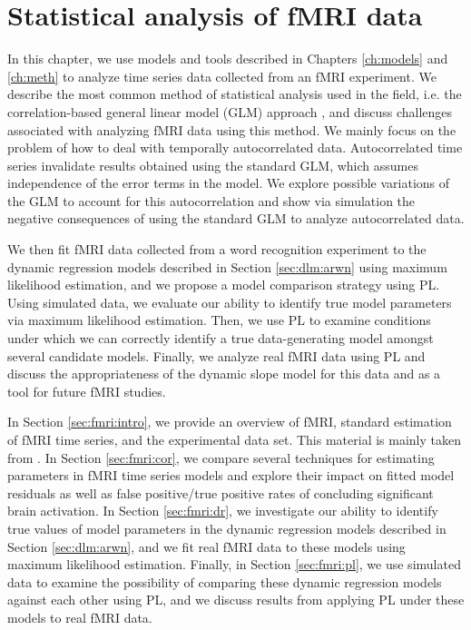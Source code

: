 \chapter{Statistical analysis of fMRI data \label{ch:fmri}}

In this chapter, we use models and tools described in Chapters \ref{ch:models} and \ref{ch:meth} to analyze time series data collected from an fMRI experiment. We describe the most common method of statistical analysis used in the field, i.e. the correlation-based general linear model (GLM) approach \citep{friston:frith:JCBFM:1991,friston:holmes:hbm:1995}, and discuss challenges associated with analyzing fMRI data using this method. We mainly focus on the problem of how to deal with temporally autocorrelated data. Autocorrelated time series invalidate results obtained using the standard GLM, which assumes independence of the error terms in the model. We explore possible variations of the GLM to account for this autocorrelation and show via simulation the negative consequences of using the standard GLM to analyze autocorrelated data.

We then fit fMRI data collected from a word recognition experiment to the dynamic regression models described in Section \ref{sec:dlm:arwn} using maximum likelihood estimation, and we propose a model comparison strategy using PL. Using simulated data, we evaluate our ability to identify true model parameters via maximum likelihood estimation. Then, we use PL to examine conditions under which we can correctly identify a true data-generating model amongst several candidate models. Finally, we analyze real fMRI data using PL and discuss the appropriateness of the dynamic slope model for this data and as a tool for future fMRI studies.

In Section \ref{sec:fmri:intro}, we provide an overview of fMRI, standard estimation of fMRI time series, and the experimental data set. This material is mainly taken from \citet{ashby:fmri:2011}. In Section \ref{sec:fmri:cor}, we compare several techniques for estimating parameters in fMRI time series models and explore their impact on fitted model residuals as well as false positive/true positive rates of concluding significant brain activation. In Section \ref{sec:fmri:dr}, we investigate our ability to identify true values of model parameters in the dynamic regression models described in Section \ref{sec:dlm:arwn}, and we fit real fMRI data to these models using maximum likelihood estimation. Finally, in Section \ref{sec:fmri:pl}, we use simulated data to examine the possibility of comparing these dynamic regression models against each other using PL, and we discuss results from applying PL under these models to real fMRI data.

